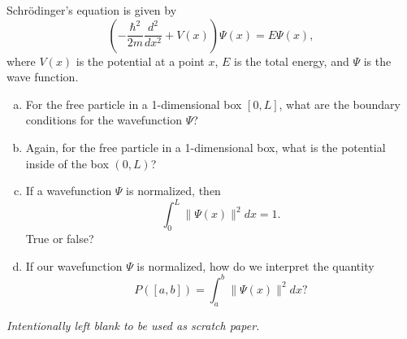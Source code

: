 \documentclass[12pt]{amsbook}
\begin{document}
\newpage
\begin{problem}
Schr\"odinger's equation is given by
\[
\left(-\frac{\hbar^2}{2m}\frac{d^2}{dx^2}+V(x)\right)\Psi(x)=E\Psi(x),
\]
where $V(x)$ is the potential at a point $x$, $E$ is the total energy, and $\Psi$ is the wave function.
\begin{enumerate}[(a)]
    \item For the free particle in a 1-dimensional box $[0,L]$, what are the boundary conditions for the wavefunction $\Psi$?
    \vspace*{3cm}
    \item Again, for the free particle in a 1-dimensional box, what is the potential inside of the box $(0,L)$?
    \vspace*{3cm}
    \item If a wavefunction $\Psi$ is normalized, then
    \[
    \int_0^L \|\Psi(x)\|^2dx=1.
    \]
    True or false?
    \vspace*{3cm}
    \item If our wavefunction $\Psi$ is normalized, how do we interpret the quantity
    \[
    P([a,b])=\int_a^b \|\Psi(x)\|^2dx?
    \]
    \vspace*{3cm}

\end{enumerate}
\end{problem}

\newpage
\emph{Intentionally left blank to be used as scratch paper.}\\
\end{document}
